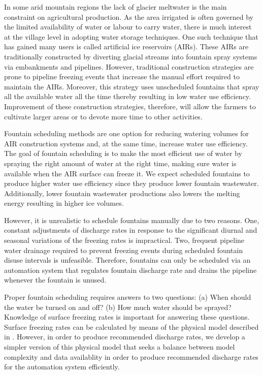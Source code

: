 \documentclass[tc, manuscript]{copernicus}
\begin{document}
\introduction

In some arid mountain regions the lack of glacier meltwater is the main constraint on agricultural production.
As the area irrigated is often governed by the limited availability of water or labour to carry water, there is
much interest at the village level in adopting water storage techniques. One such technique that has gained many
users is called artificial ice reservoirs (AIRs). These AIRs are traditionally constructed by diverting glacial
streams into fountain spray systems via embankments and pipelines. However, traditional construction strategies
are prone to pipeline freezing events that increase the manual effort required to maintain the AIRs. Moreover,
this strategy uses unscheduled fountains that spray all the available water all the time thereby resulting in
low water use efficiency. Improvement of these construction strategies, therefore, will allow the farmers to
cultivate larger areas or to devote more time to other activities. 

Fountain scheduling methods are one option for reducing watering volumes for AIR construction systems and, at
the same time, increase water use efficiency. The goal of fountain scheduling is to make the most efficient use
of water by spraying the right amount of water at the right time, making sure water is available when the AIR
surface can freeze it. We expect scheduled fountains to produce higher water use efficiency since they produce
lower fountain wastewater. Additionally, lower fountain wastewater productions also lowers the melting energy
resulting in higher ice volumes.

However, it is unrealistic to schedule fountains manually due to two reasons. One, constant adjustments of
discharge rates in response to the significant diurnal and seasonal variations of the freezing rates is
impractical. Two, frequent pipeline water drainage required to prevent freezing events during scheduled fountain
disuse intervals is unfeasible. Therefore, fountains can only be scheduled via an automation system that
regulates fountain discharge rate and drains the pipeline whenever the fountain is unused.

Proper fountain scheduling requires answers to two questions: (a) When should the water be turned on and off?
(b) How much water should be sprayed? Knowledge of surface freezing rates is important for answering these
questions. Surface freezing rates can be calculated by means of the physical model described in
\cite{balasubramanianInfluenceMeteorologicalConditions2022}. However, in order to produce recommended discharge
rates, we develop a simpler version of this physical model that seeks a balance between model complexity and
data availablity in order to produce recommended discharge rates for the automation system efficiently.
\end{document}
